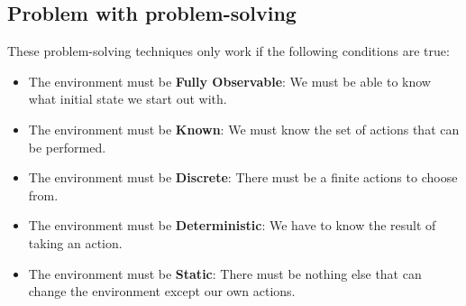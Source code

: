 \documentclass[12pt]{article}
\begin{document}
\subsection*{Problem with problem-solving}
These problem-solving techniques only work if the following conditions are true:
\begin{itemize}
\item The environment must be \textbf{Fully Observable}: We must be able to know what initial state we start out with.
\item The environment must be \textbf{Known}: We must know the set of actions that can be performed.
\item The environment must be \textbf{Discrete}: There must be a finite actions to choose from.
\item The environment must be \textbf{Deterministic}: We have to know the result of taking an action.
\item The environment must be \textbf{Static}: There must be nothing else that can change the environment except our own actions.
\end{itemize}
\end{document}
